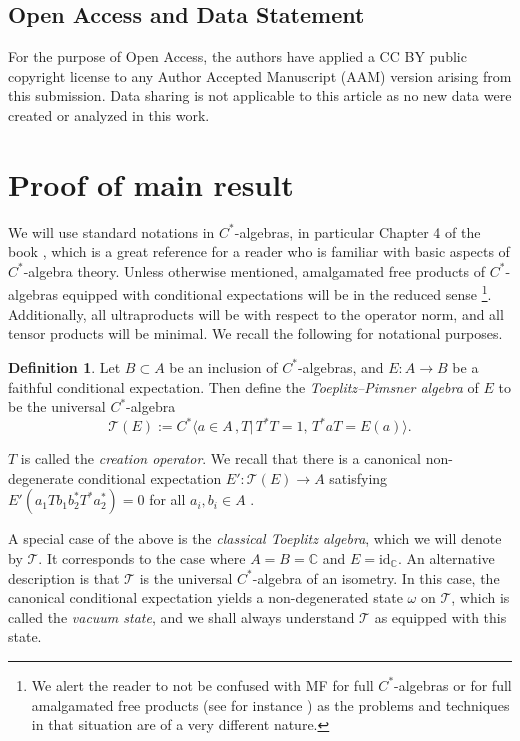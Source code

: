 \documentclass[10pt]{amsart}
\theoremstyle{definition}
\newtheorem{defn}[thm]{Definition}
\newcommand{\C}{\ensuremath{\mathbb{C}}}
\newcommand{\cT}{\ensuremath{\mathcal{T}}}
\begin{document}
\subsection{Open Access and Data Statement}

For the purpose of Open Access, the authors have applied a CC BY public copyright license to any Author Accepted Manuscript (AAM) version arising from this submission. Data sharing is not applicable to this article as no new data were created or analyzed in this work.



\section{Proof of main result}

We will use standard notations in $C^*$-algebras, in particular Chapter 4 of the book \cite{brown2008textrm}, which is a great reference for a reader who is familiar with basic aspects of $C^*$-algebra theory. Unless otherwise mentioned, amalgamated free products of $C^*$-algebras equipped with conditional expectations will be in the reduced sense \cite{voiculescu1985symmetries}\footnote{We alert the reader to not be confused with MF for full $C^*$-algebras or for full amalgamated free products (see for instance \cite{shulman2026mfpropertyamalgamatedfree}) as the problems and techniques in that situation are of a very different nature.}. Additionally, all ultraproducts will be with respect to the operator norm, and all tensor products will be minimal. We recall the following for notational purposes. 
\begin{defn}
    Let $B\subset A$ be an inclusion of $C^*$-algebras, and $E:A\to B$ be a faithful conditional expectation. Then define the \emph{Toeplitz--Pimsner algebra} of $E$ to be the universal $C^*$-algebra
    \[\cT(E) := C^*\langle a\in A\,,T \big| \,T^*T=1,\, T^*aT = E(a)\rangle. \]

    $T$ is called the \emph{creation operator}. We recall that there is a canonical non-degenerate conditional expectation $E': \cT(E) \to A$ satisfying $E'(a_1Tb_1b_2^\ast T^\ast a_2^\ast) = 0$ for all $a_i, b_i \in A$ \cite[Theorem 4.6.6(2)]{brown2008textrm}.

    A special case of the above is the \emph{classical Toeplitz algebra}, which we will denote by $\cT$. It corresponds to the case where $A = B = \C$ and $E = \text{id}_\C$. An alternative description is that $\cT$ is the universal $C^\ast$-algebra of an isometry. In this case, the canonical conditional expectation yields a non-degenerated state $\omega$ on $\cT$, which is called the \emph{vacuum state}, and we shall always understand $\cT$ as equipped with this state.
\end{defn}
\end{document}
